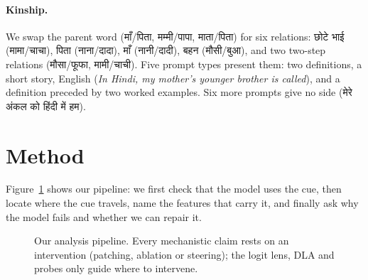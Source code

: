 \documentclass[11pt]{article}
\newcommand{\hi}[1]{{\devfont #1}}
\begin{document}
\paragraph{Kinship.} We swap the parent word (\hi{माँ/पिता}, \hi{मम्मी/पापा}, \hi{माता/पिता}) for six relations: \hi{छोटे भाई} (\hi{मामा/चाचा}), \hi{पिता} (\hi{नाना/दादा}), \hi{माँ} (\hi{नानी/दादी}), \hi{बहन} (\hi{मौसी/बुआ}), and two two-step relations (\hi{मौसा/फूफा}, \hi{मामी/चाची}). Five prompt types present them: two definitions, a short story, English (\emph{In Hindi, my mother's younger brother is called}), and a definition preceded by two worked examples. Six more prompts give no side (\hi{मेरे अंकल को हिंदी में हम}).

\section{Method}
\label{sec:method}

Figure~\ref{fig:pipeline} shows our pipeline: we first check that the model uses the cue, then locate where the cue travels, name the features that carry it, and finally ask why the model fails and whether we can repair it.

\begin{figure}[t]
\centering
{}
\caption{Our analysis pipeline. Every mechanistic claim rests on an intervention (patching, ablation or steering); the logit lens, DLA and probes only guide where to intervene.}
\label{fig:pipeline}
\end{figure}
\end{document}
